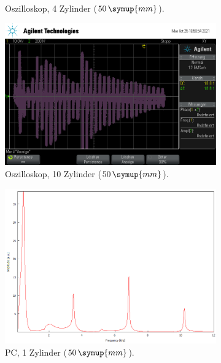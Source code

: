 \begin{figure}
\begin{subfigure}[b]{0.3\textwidth}
        \caption{Oszilloskop, 4 Zylinder ($50 \, \symup{mm}$).}
    \end{subfigure}
    \hfill
    \begin{subfigure}[b]{0.3\textwidth}
        \centering
        \includegraphics[width=\textwidth]{data/1_1zylinder50mm/scope_10.png}
        \caption{Oszilloskop, 10 Zylinder ($50 \, \symup{mm}$).}
    \end{subfigure}
    \hfill
    \begin{subfigure}[b]{0.3\textwidth}
        \centering
        \includegraphics[width=\textwidth]{data/1_2zylinder50mmPC/1.png}
        \caption{PC, 1 Zylinder ($50 \, \symup{mm}$).}
    \end{subfigure}
    \hfill
    \begin{subfigure}[b]{0.3\textwidth}
        \centering

\end{subfigure}
\end{figure}
